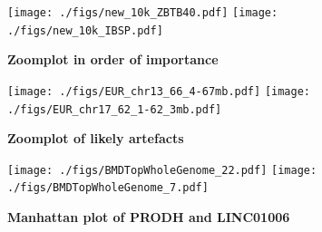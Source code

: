 \documentclass[11pt]{article}
\begin{document}
\begin{figure}[tbhp]
    \caption{\textbf{Zoomplot in order of importance}}
    \label{figure:knowngeneranks}
      \texttt{[image: ./figs/new\_10k\_ZBTB40.pdf]}
        \texttt{[image: ./figs/new\_10k\_IBSP.pdf]}
    \begin{flushleft}
     \end{flushleft}
\end{figure}


\begin{figure}[tbhp]
    \caption{\textbf{Zoomplot of likely artefacts}}
    \label{figure:knowngeneranks}
      \texttt{[image: ./figs/EUR\_chr13\_66\_4-67mb.pdf]}
        \texttt{[image: ./figs/EUR\_chr17\_62\_1-62\_3mb.pdf]}
    \begin{flushleft}
     \end{flushleft}
\end{figure}


\begin{figure}[tbhp]
    \caption{\textbf{Manhattan plot of PRODH and LINC01006}}
    \label{figure:knowngeneranks}
        \texttt{[image: ./figs/BMDTopWholeGenome\_22.pdf]}
      \texttt{[image: ./figs/BMDTopWholeGenome\_7.pdf]}
    \begin{flushleft}
     \end{flushleft}
\end{figure}




%

\end{document}
